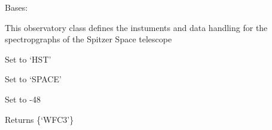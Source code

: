\documentclass[a4paper,10pt,english]{sphinxmanual}
\begin{document}
\begin{fulllineitems}
\label{\detokenize{cascade.instruments:cascade.instruments.instruments.HST}}
Bases: {\hyperref[\detokenize{cascade.instruments:cascade.instruments.instruments.ObservatoryBase}]{}}

This observatory class defines the instuments and data handling for the
spectropgraphs of the Spitzer Space telescope

\begin{fulllineitems}
\label{\detokenize{cascade.instruments:cascade.instruments.instruments.HST.name}}
Set to ‘HST’

\end{fulllineitems}


\begin{fulllineitems}
\label{\detokenize{cascade.instruments:cascade.instruments.instruments.HST.location}}
Set to ‘SPACE’

\end{fulllineitems}


\begin{fulllineitems}
\label{\detokenize{cascade.instruments:cascade.instruments.instruments.HST.NAIF_ID}}
Set to -48

\end{fulllineitems}


\begin{fulllineitems}
\label{\detokenize{cascade.instruments:cascade.instruments.instruments.HST.observatory_instruments}}
Returns \{‘WFC3’\}

\end{fulllineitems}


\end{fulllineitems}
\end{document}
